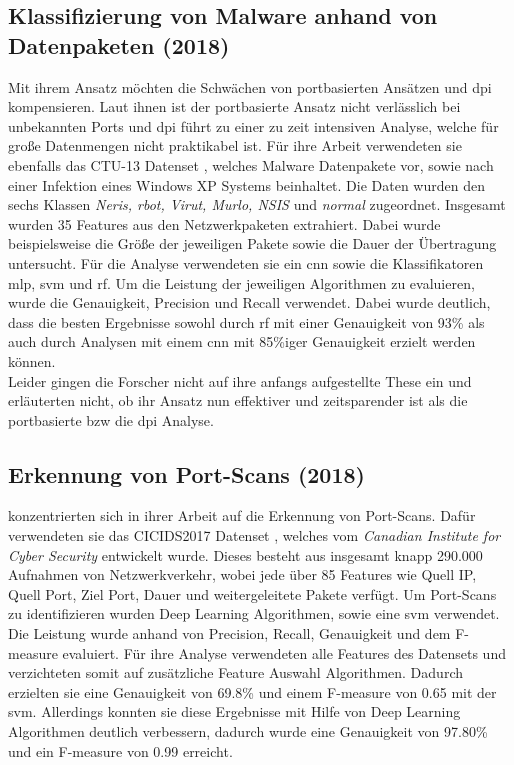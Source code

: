 \documentclass[
    12pt, %
    DIV10,
    ngerman, %
    a4paper, %
    oneside, %
    titlepage, %
    parskip=half, %
    headings=normal, %
    listof=totoc, %
    bibliography=totoc, %
    index=totoc, %
    captions=tableheading, %
    final %
]{scrreprt}
\begin{document}
\subsection{Klassifizierung von Malware anhand von Datenpaketen (2018)}
Mit ihrem Ansatz möchten \textcite{Yeo2018} die Schwächen von portbasierten Ansätzen und \ac{dpi} kompensieren. Laut ihnen ist der portbasierte Ansatz nicht verlässlich bei unbekannten Ports und \ac{dpi} \parencite{dharmapurikar2003deep} führt zu einer zu zeit intensiven Analyse, welche für große Datenmengen nicht praktikabel ist. Für ihre Arbeit verwendeten sie ebenfalls das CTU-13 Datenset \parencite{garcia2014empirical}, welches Malware Datenpakete vor, sowie nach einer Infektion eines Windows XP Systems beinhaltet. Die Daten wurden den sechs Klassen \emph{Neris, rbot, Virut, Murlo, NSIS} und \emph{normal} zugeordnet. Insgesamt wurden 35 Features aus den Netzwerkpaketen extrahiert. Dabei wurde beispielsweise die Größe der jeweiligen Pakete sowie die Dauer der Übertragung untersucht. Für die Analyse verwendeten sie ein \ac{cnn} sowie die Klassifikatoren \ac{mlp}, \ac{svm} und \ac{rf}. Um die Leistung der jeweiligen Algorithmen zu evaluieren, wurde die Genauigkeit, Precision und Recall verwendet. Dabei wurde deutlich, dass die besten Ergebnisse sowohl durch \ac{rf} mit einer Genauigkeit von 93\% als auch durch Analysen mit einem \ac{cnn} mit 85\%iger Genauigkeit erzielt werden können. \\
Leider gingen die Forscher nicht auf ihre anfangs aufgestellte These ein und erläuterten nicht, ob ihr Ansatz nun effektiver und zeitsparender ist als die portbasierte bzw die \ac{dpi} Analyse.
%
\subsection{Erkennung von Port-Scans (2018)}
\textcite{Aksu2019} konzentrierten sich in ihrer Arbeit auf die Erkennung von Port-Scans. Dafür verwendeten sie das CICIDS2017 Datenset \parencite{Sharafaldin2018}, welches vom \emph{Canadian Institute for Cyber Security} entwickelt wurde. Dieses besteht aus insgesamt knapp 290.000 Aufnahmen von Netzwerkverkehr, wobei jede über 85 Features wie Quell IP, Quell Port, Ziel Port, Dauer und weitergeleitete Pakete verfügt. Um Port-Scans zu identifizieren wurden Deep Learning Algorithmen, sowie eine \ac{svm} verwendet. Die Leistung wurde anhand von Precision, Recall, Genauigkeit und dem F-measure evaluiert. Für ihre Analyse verwendeten  \textcite{Aksu2019} alle Features des Datensets und verzichteten somit auf zusätzliche Feature Auswahl Algorithmen. Dadurch erzielten sie eine Genauigkeit von 69.8\% und einem F-measure von 0.65 mit der \ac{svm}. Allerdings  konnten sie diese Ergebnisse mit Hilfe von Deep Learning Algorithmen deutlich verbessern, dadurch wurde eine Genauigkeit von 97.80\% und ein F-measure von 0.99 erreicht.
%
\end{document}
